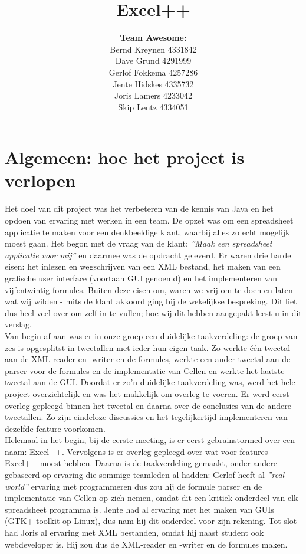 \documentclass[a4paper,11pt,titlepage]{scrartcl}
\title{\huge\textbf{Excel++}}
\author{\textbf{Team Awesome:}\\
		Bernd Kreynen 4331842\\
		Dave Grund 4291999\\
		Gerlof Fokkema 4257286\\
		Jente Hidskes 4335732\\
		Joris Lamers 4233042\\
		Skip Lentz 4334051\\
	   }
\begin{document}
\begin{titlepage}
\maketitle
\thispagestyle{empty} %
\end{titlepage}

\setcounter{tocdepth}{2}
\tableofcontents

\newpage\section{Algemeen: hoe het project is verlopen}
Het doel van dit project was het verbeteren van de kennis van Java en het opdoen van ervaring met werken in een team. De opzet was om een spreadsheet applicatie te maken voor een denkbeeldige klant, waarbij alles zo echt mogelijk moest gaan. Het begon met de vraag van de klant: \textit{''Maak een spreadsheet applicatie voor mij''} en daarmee was de opdracht geleverd. Er waren drie harde eisen: het inlezen en wegschrijven van een XML bestand, het maken van een grafische user interface (voortaan GUI genoemd) en het implementeren van vijfentwintig formules. Buiten deze eisen om, waren we vrij om te doen en laten wat wij wilden - mits de klant akkoord ging bij de wekelijkse bespreking. Dit liet dus heel veel over om zelf in te vullen; hoe wij dit hebben aangepakt leest u in dit verslag.\\

Van begin af aan was er in onze groep een duidelijke taakverdeling: de groep van zes is opgesplitst in tweetallen met ieder hun eigen taak. Zo werkte één tweetal aan de XML-reader en -writer en de formules, werkte een ander tweetal aan de parser voor de formules en de implementatie van Cellen en werkte het laatste tweetal aan de GUI. Doordat er zo’n duidelijke taakverdeling was, werd het hele project overzichtelijk en was het makkelijk om overleg te voeren. Er werd eerst overleg gepleegd binnen het tweetal en daarna over de conclusies van de andere tweetallen. Zo zijn eindeloze discussies en het tegelijkertijd implementeren van dezelfde feature voorkomen.\\

Helemaal in het begin, bij de eerste meeting, is er eerst gebrainstormed over een naam: Excel++. Vervolgens is er overleg gepleegd over wat voor features Excel++ moest hebben. Daarna is de taakverdeling gemaakt, onder andere gebaseerd op ervaring die sommige teamleden al hadden: Gerlof heeft al \textit{''real world''} ervaring met programmeren dus zou hij de formule parser en de implementatie van Cellen op zich nemen, omdat dit een kritiek onderdeel van elk spreadsheet programma is. Jente had al ervaring met het maken van GUIs (GTK+ toolkit op Linux), dus nam hij dit onderdeel voor zijn rekening. Tot slot had Joris al ervaring met XML bestanden, omdat hij naast student ook webdeveloper is. Hij zou dus de XML-reader en -writer en de formules maken.\\
\end{document}
